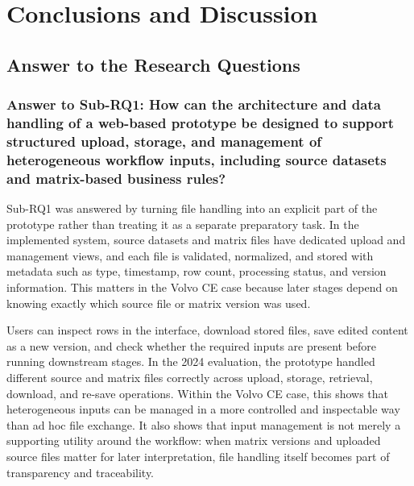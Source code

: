 
\chapter{Conclusions and Discussion} 
\label{cha:Discussion}




\section{Answer to the Research Questions}







\subsection{Answer to Sub-RQ1: How can the architecture and data handling of a web-based prototype be designed to support structured upload, storage, and management of heterogeneous workflow inputs, including source datasets and matrix-based business rules?}

Sub-RQ1 was answered by turning file handling into an explicit part of the prototype rather than treating it as a separate preparatory task. In the implemented system, source datasets and matrix files have dedicated upload and management views, and each file is validated, normalized, and stored with metadata such as type, timestamp, row count, processing status, and version information. This matters in the Volvo CE case because later stages depend on knowing exactly which source file or matrix version was used.

Users can inspect rows in the interface, download stored files, save edited content as a new version, and check whether the required inputs are present before running downstream stages. In the 2024 evaluation, the prototype handled different source and matrix files correctly across upload, storage, retrieval, download, and re-save operations. Within the Volvo CE case, this shows that heterogeneous inputs can be managed in a more controlled and inspectable way than ad hoc file exchange. It also shows that input management is not merely a supporting utility around the workflow: when matrix versions and uploaded source files matter for later interpretation, file handling itself becomes part of transparency and traceability.

